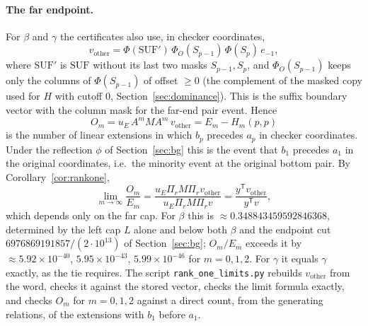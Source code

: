 \documentclass[11pt]{amsart}
\theoremstyle{definition}
\theoremstyle{remark}
\begin{document}
\paragraph{The far endpoint.} For $\beta$ and $\gamma$ the certificates also use, in checker coordinates,
\[
v_{\mathrm{other}}=\Phi(\mathrm{SUF}')\,\Phi_O(S_{p-1})\,\Phi(S_p)\,e_{-1},
\]
where $\mathrm{SUF}'$ is $\mathrm{SUF}$ without its last two masks $S_{p-1},S_p$, and $\Phi_O(S_{p-1})$ keeps only the columns of $\Phi(S_{p-1})$ of offset $\ge0$ (the complement of the masked copy used for $H$ with cutoff $0$, Section~\ref{sec:dominance}). This is the suffix boundary vector with the column mask for the far-end pair event. Hence
\[
O_m=u_E\,A^mMA^m\,v_{\mathrm{other}}=E_m-H_m(p,p)
\]
is the number of linear extensions in which $b_p$ precedes $a_p$ in checker coordinates. Under the reflection $\phi$ of Section~\ref{sec:bg} this is the event that $b_1$ precedes $a_1$ in the original coordinates, i.e.\ the minority event at the original bottom pair. By Corollary~\ref{cor:rankone},
\[
\lim_{m\to\infty}\frac{O_m}{E_m}=\frac{u_E\Pi_rM\Pi_rv_{\mathrm{other}}}{u_E\Pi_rM\Pi_rv}=\frac{y^{\mathsf T}v_{\mathrm{other}}}{y^{\mathsf T}v},
\]
which depends only on the far cap. For $\beta$ this is $\approx0.348843459592846368$, determined by the left cap $L$ alone and below both $\beta$ and the endpoint cut $6976869191857/(2\cdot10^{13})$ of Section~\ref{sec:bg}; $O_m/E_m$ exceeds it by $\approx5.92\times10^{-40}$, $5.95\times10^{-43}$, $5.99\times10^{-46}$ for $m=0,1,2$. For $\gamma$ it equals $\gamma$ exactly, as the tie requires. The script \texttt{rank\_one\_limits.py} rebuilds $v_{\mathrm{other}}$ from the word, checks it against the stored vector, checks the limit formula exactly, and checks $O_m$ for $m=0,1,2$ against a direct count, from the generating relations, of the extensions with $b_1$ before $a_1$.
\end{document}
